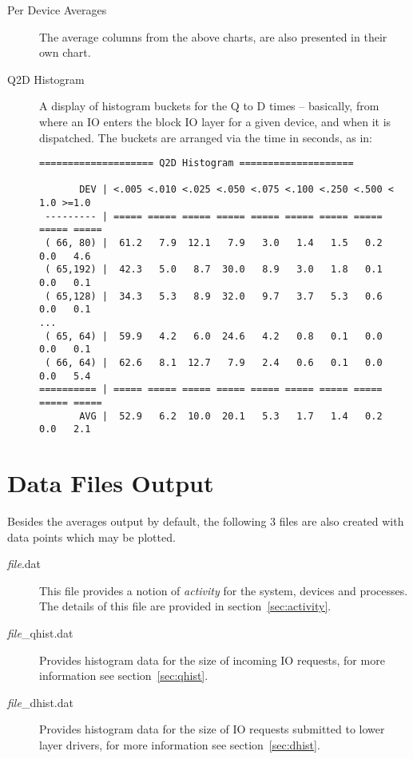 \documentclass{article}
\begin{document}
\begin{description}
  \item[Per Device Averages] The average columns from the above charts,
  are also presented in their own chart.

  \item[Q2D Histogram] A display of histogram buckets for the Q to D times
  -- basically, from where an IO enters the block IO layer for a given
  device, and when it is dispatched. The buckets are arranged via the
  time in seconds, as in:

\begin{verbatim}
==================== Q2D Histogram ====================

       DEV | <.005 <.010 <.025 <.050 <.075 <.100 <.250 <.500 < 1.0 >=1.0
 --------- | ===== ===== ===== ===== ===== ===== ===== ===== ===== =====
 ( 66, 80) |  61.2   7.9  12.1   7.9   3.0   1.4   1.5   0.2   0.0   4.6
 ( 65,192) |  42.3   5.0   8.7  30.0   8.9   3.0   1.8   0.1   0.0   0.1
 ( 65,128) |  34.3   5.3   8.9  32.0   9.7   3.7   5.3   0.6   0.0   0.1
...
 ( 65, 64) |  59.9   4.2   6.0  24.6   4.2   0.8   0.1   0.0   0.0   0.1
 ( 66, 64) |  62.6   8.1  12.7   7.9   2.4   0.6   0.1   0.0   0.0   5.4
========== | ===== ===== ===== ===== ===== ===== ===== ===== ===== =====
       AVG |  52.9   6.2  10.0  20.1   5.3   1.7   1.4   0.2   0.0   2.1
\end{verbatim}

\end{description}

\newpage\section{\label{sec:data-files}Data Files Output}

  Besides the averages output by default, the following 3 files are also
  created with data points which may be plotted.

\begin{description}
  \item[\emph{file}.dat] This file provides a notion of \emph{activity}
  for the system, devices and processes. The details of this file are
  provided in section~\ref{sec:activity}.

  \item[\emph{file}\_qhist.dat] Provides histogram data for the size of
  incoming IO requests, for more information see section~\ref{sec:qhist}.

  \item[\emph{file}\_dhist.dat] Provides histogram data for the size
  of IO requests submitted to lower layer drivers, for more information
  see section~\ref{sec:dhist}.

\end{description}
\end{document}
